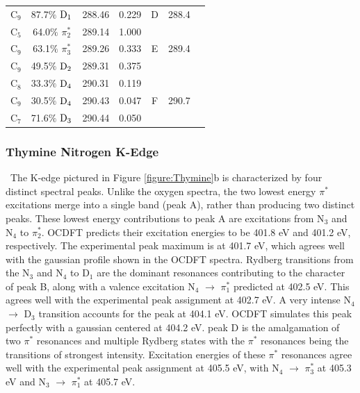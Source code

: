 \documentclass[12pt]{article}
\begin{document}
\begin{table}[!t]
\begin{tabular*}{8.5cm}{@{\extracolsep{\fill} }cccrccc}
     C$_9$
 &   87.7$\%$ $\rm D_1$  & 288.46 & 0.229 & D & 288.4
  \vspace{0.05in}  \\
    C$_5$
 &   64.0$\%$ $\pi_2^*$  & 289.14 & 1.000 & \multirow{3}{*}{E} & \multirow{3}{*}{289.4} \\
    C$_9$
 &   63.1$\%$ $\pi_3^*$  & 289.26 & 0.333 \\
    C$_9$
 &   49.5$\%$ $\rm D_2$  & 289.31 & 0.375 
 \vspace{0.05in}\\
    C$_8$
 &   33.3$\%$ $\rm D_4$  & 290.31 & 0.119 & \multirow{3}{*}{F} &  \multirow{3}{*}{290.7}  \\
    C$_9$
 &   30.5$\%$ $\rm D_4$  & 290.43 & 0.047 \\
    C$_7$
 &   71.6$\%$ $\rm D_3$  & 290.44 & 0.050 \\
\hline\hline%
   \end{tabular*}
   \label{table: thymine_k_oxygen}
   \end{table}
\subsubsection{Thymine Nitrogen K-Edge} \ The K-edge pictured in Figure \ref{figure:Thymine}b is characterized by four distinct spectral peaks. Unlike the oxygen spectra, the two lowest energy $\pi^*$ excitations merge into a single band (peak A), rather than producing two distinct peaks. These lowest energy contributions to peak A are excitations from N$_3$ and N$_4$ to $\pi^*_2$. OCDFT predicts their excitation energies to be 401.8 eV and 401.2 eV, respectively. The experimental peak maximum is at 401.7 eV, which agrees well with the gaussian profile shown in the OCDFT spectra. Rydberg transitions from the N$_3$ and N$_4$ to D$_1$ are the dominant resonances contributing to the character of peak B, along with a valence excitation N$_4$ $\rightarrow$ $\pi^*_1$ predicted at 402.5 eV. This agrees well with the experimental peak assignment at 402.7 eV. A very intense N$_4$ $\rightarrow$ D$_3$ transition accounts for the peak at 404.1 eV. OCDFT simulates this peak perfectly with a gaussian centered at 404.2 eV. peak D is the amalgamation of two $\pi^*$ resonances and multiple Rydberg states with the $\pi^*$ resonances being the transitions of strongest intensity. Excitation energies of these $\pi^*$ resonances agree well with the experimental peak assignment at 405.5 eV, with N$_4$ $\rightarrow$ $\pi^*_3$ at 405.3 eV and N$_3$ $\rightarrow$ $\pi^*_1$ at 405.7 eV.
\end{document}
